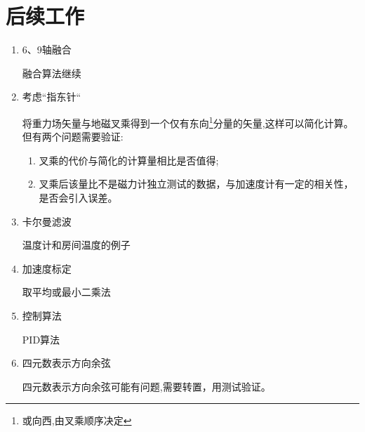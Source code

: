 \section{后续工作}
\begin{enumerate}
    \item 6、9轴融合
        
        融合算法继续
    \item 考虑“指东针“

        将重力场矢量与地磁叉乘得到一个仅有东向\footnote{或向西,由叉乘顺序决定}分量的矢量,这样可以简化计算。但有两个问题需要验证:
        \begin{enumerate}
            \item 叉乘的代价与简化的计算量相比是否值得;
            \item 叉乘后该量比不是磁力计独立测试的数据，与加速度计有一定的相关性，是否会引入误差。
        \end{enumerate} 
    \item 卡尔曼滤波

        温度计和房间温度的例子
    \item 加速度标定

        取平均或最小二乘法
    \item 控制算法

        PID算法
    \item 四元数表示方向余弦
        
        四元数表示方向余弦可能有问题,需要转置\citep{捷联惯导航,9轴融合论文}，用测试验证。
\end{enumerate}

